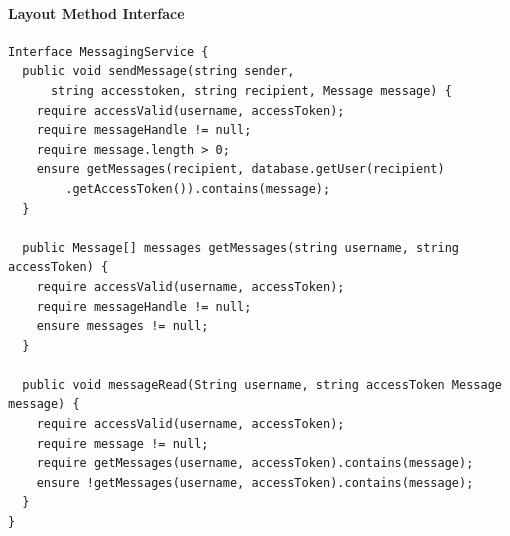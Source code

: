 			\paragraph{Layout Method Interface}
			\begin{verbatim}
Interface MessagingService {
  public void sendMessage(string sender,
      string accesstoken, string recipient, Message message) {
    require accessValid(username, accessToken);
    require messageHandle != null;
    require message.length > 0;
    ensure getMessages(recipient, database.getUser(recipient)
        .getAccessToken()).contains(message);
  }

  public Message[] messages getMessages(string username, string accessToken) {
    require accessValid(username, accessToken);
    require messageHandle != null;
    ensure messages != null;
  }

  public void messageRead(String username, string accessToken Message message) {
    require accessValid(username, accessToken);
    require message != null;
    require getMessages(username, accessToken).contains(message);
    ensure !getMessages(username, accessToken).contains(message);
  }
}
\end{verbatim}
				
        

